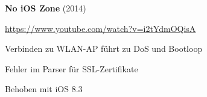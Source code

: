 \begin{frame}
	\centering
	\textbf{No iOS Zone} (2014)
	\begin{block}{}
		\url{https://www.youtube.com/watch?v=i2tYdmOQisA}
	\end{block}
	\begin{block}{}
		Verbinden zu WLAN-AP führt zu DoS und Bootloop
	\end{block}
	\begin{block}{}
		Fehler im Parser für SSL-Zertifikate
	\end{block}
	\begin{block}{}
		Behoben mit iOS 8.3
	\end{block}
\end{frame}